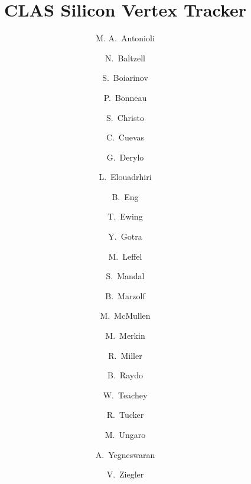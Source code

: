 \title{CLAS Silicon Vertex Tracker}

\author[A]{M. A.~Antonioli}
\author[A]{N.~Baltzell}
\author[A]{S.~Boiarinov}
\author[A]{P.~Bonneau}
\author[A]{S.~Christo}
\author[A]{C.~Cuevas}
\author[B]{G.~Derylo}
\author[A]{L.~Elouadrhiri}
\author[A]{B.~Eng}
\author[A]{T.~Ewing}
\author[A]{Y.~Gotra}
\author[A]{M.~Leffel}
\author[A]{S.~Mandal}
\author[A]{B.~Marzolf}
\author[A]{M.~McMullen}
\author[C]{M.~Merkin}
\author[A]{R.~Miller}
\author[A]{B.~Raydo}
\author[A]{W.~Teachey}
\author[D]{R.~Tucker}
\author[A]{M.~Ungaro}
\author[A]{A.~Yegneswaran}
\author[A]{V.~Ziegler}

\address[A]{Thomas Jefferson National Accelerator Facility, Newport News, VA, USA}
\address[B]{Fermi National Accelerator Laboratory, Batavia, IL, USA}
\address[C]{Skobeltsyn Institute of Nuclear Physics, Moscow State University, Moscow, Russia}
\address[D]{Arizona State University, Tempe, AZ}

